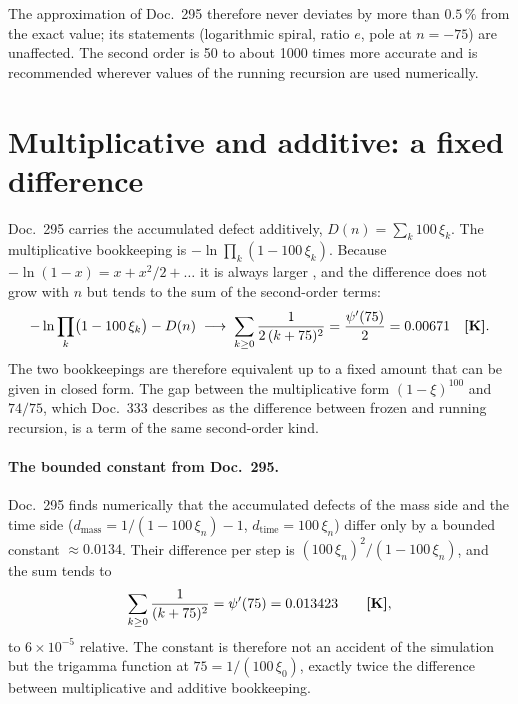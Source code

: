 The approximation of Doc.~295 therefore never deviates by more than $0.5\,\%$ from
the exact value; its statements (logarithmic spiral, ratio $e$, pole at $n=-75$)
are unaffected. The second order is 50 to about 1000 times more accurate and is
recommended wherever values of the running recursion are used numerically.

\section{Multiplicative and additive: a fixed difference}

Doc.~295 carries the accumulated defect additively, $D(n)=\sum_k100\,\xi_k$. The
multiplicative bookkeeping is $-\ln\prod_k(1-100\,\xi_k)$. Because
$-\ln(1-x)=x+x^2/2+\dots$ it is always larger \KM, and the difference does not grow
with $n$ but tends to the sum of the second-order terms:
\begin{equation}
  -\ln\prod_{k}\bigl(1-100\,\xi_k\bigr)-D(n)\;\longrightarrow\;
  \sum_{k\ge0}\frac{1}{2\,(k+75)^2}=\frac{\psi'(75)}{2}=0.00671 \quad\textbf{[K]}.
\end{equation}
The two bookkeepings are therefore equivalent up to a fixed amount that can be
given in closed form. The gap between the multiplicative form $(1-\xi)^{100}$ and
$74/75$, which Doc.~333 describes as the difference between frozen and running
recursion, is a term of the same second-order kind.

\paragraph{The bounded constant from Doc.~295.}
Doc.~295 finds numerically that the accumulated defects of the mass side and the
time side ($d_\text{mass}=1/(1-100\,\xi_n)-1$, $d_\text{time}=100\,\xi_n$) differ
only by a bounded constant $\approx0.0134$. Their difference per step is
$(100\,\xi_n)^2/(1-100\,\xi_n)$, and the sum tends to
\begin{equation}
  \sum_{k\ge0}\frac{1}{(k+75)^2}=\psi'(75)=0.013423 \qquad\textbf{[K]},
\end{equation}
to $6\times10^{-5}$ relative. The constant is therefore not an accident of the
simulation but the trigamma function at $75=1/(100\,\xi_0)$, exactly twice the
difference between multiplicative and additive bookkeeping.

